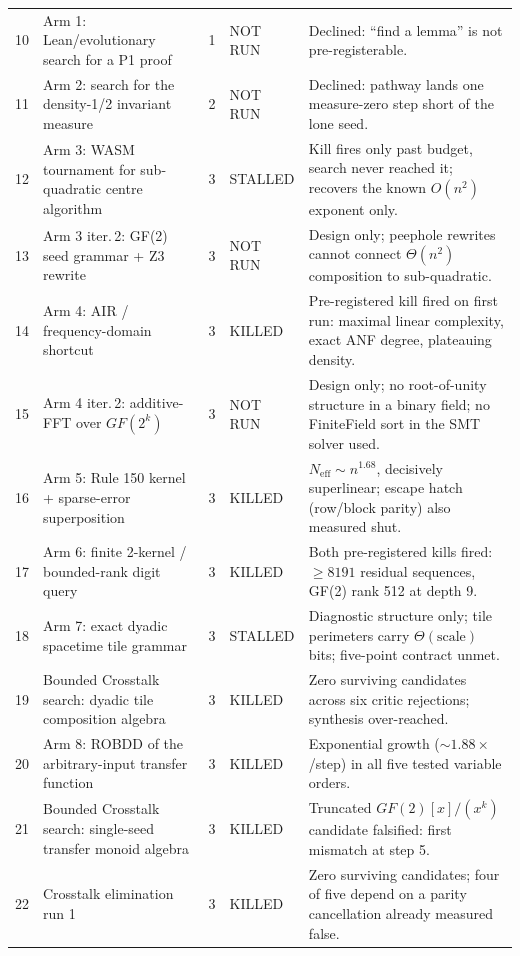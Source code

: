 \documentclass[11pt]{article}
\theoremstyle{definition}
\begin{document}
{\begin{longtable}{@{}r p{4.0cm} c p{1.7cm} p{6.1cm}@{}}
10 & Arm 1: Lean/evolutionary search for a P1 proof & 1 & NOT RUN & Declined: ``find a lemma'' is not pre-registerable. \\
11 & Arm 2: search for the density-1/2 invariant measure & 2 & NOT RUN & Declined: pathway lands one measure-zero step short of the lone seed. \\
12 & Arm 3: WASM tournament for sub-quadratic centre algorithm & 3 & STALLED & Kill fires only past budget, search never reached it; recovers the known $O(n^2)$ exponent only. \\
13 & Arm 3 iter.\,2: GF(2) seed grammar + Z3 rewrite & 3 & NOT RUN & Design only; peephole rewrites cannot connect $\Theta(n^2)$ composition to sub-quadratic. \\
14 & Arm 4: AIR / frequency-domain shortcut & 3 & KILLED & Pre-registered kill fired on first run: maximal linear complexity, exact ANF degree, plateauing density. \\
15 & Arm 4 iter.\,2: additive-FFT over $GF(2^k)$ & 3 & NOT RUN & Design only; no root-of-unity structure in a binary field; no FiniteField sort in the SMT solver used. \\
16 & Arm 5: Rule 150 kernel + sparse-error superposition & 3 & KILLED & $N_{\mathrm{eff}}\sim n^{1.68}$, decisively superlinear; escape hatch (row/block parity) also measured shut. \\
17 & Arm 6: finite 2-kernel / bounded-rank digit query & 3 & KILLED & Both pre-registered kills fired: $\ge8191$ residual sequences, GF(2) rank 512 at depth 9. \\
18 & Arm 7: exact dyadic spacetime tile grammar & 3 & STALLED & Diagnostic structure only; tile perimeters carry $\Theta(\text{scale})$ bits; five-point contract unmet. \\
19 & Bounded Crosstalk search: dyadic tile composition algebra & 3 & KILLED & Zero surviving candidates across six critic rejections; synthesis over-reached. \\
20 & Arm 8: ROBDD of the arbitrary-input transfer function & 3 & KILLED & Exponential growth ($\sim1.88\times$/step) in all five tested variable orders. \\
21 & Bounded Crosstalk search: single-seed transfer monoid algebra & 3 & KILLED & Truncated $GF(2)[x]/(x^k)$ candidate falsified: first mismatch at step 5. \\
22 & Crosstalk elimination run 1 & 3 & KILLED & Zero surviving candidates; four of five depend on a parity cancellation already measured false. \\

\end{longtable}}
\end{document}
